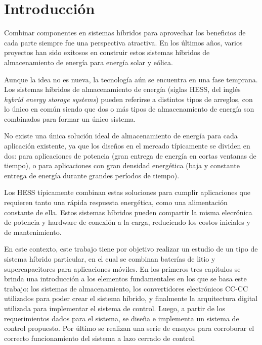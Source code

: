 \chapter*{Introducción}

Combinar componentes en sistemas híbridos para aprovechar los beneficios de cada parte siempre fue una perspectiva atractiva. En los últimos años, varios proyectos han sido exitosos en construir estos sistemas híbridos de almacenamiento de energía para energía solar y eólica.

Aunque la idea no es nueva, la tecnología aún se encuentra en una fase temprana. Los sistemas híbridos de almacenamiento de energía (siglas HESS, del inglés \emph{hybrid energy storage systems}) pueden referirse a distintos tipos de arreglos, con lo único en común siendo que dos o más tipos de almacenamiento de energía son combinados para formar un único sistema.

No existe una única solución ideal de almacenamiento de energía para cada aplicación existente, ya que los diseños en el mercado típicamente se dividen en dos: para aplicaciones de potencia (gran entrega de energía en cortas ventanas de tiempo), o para aplicaciones con gran densidad energética (baja y constante entrega de energía durante grandes períodos de tiempo).

Los HESS típicamente combinan estas soluciones para cumplir aplicaciones que requieren tanto una rápida respuesta energética, como una alimentación constante de ella. Estos sistemas híbridos pueden compartir la misma elecrónica de potencia y hardware de conexión a la carga, reduciendo los costos iniciales y de mantenimiento.

En este contexto, este trabajo tiene por objetivo realizar un estudio de un tipo de sistema híbrido particular, en el cual se combinan baterías de litio y supercapacitores para aplicaciones móviles. En los primeros tres capítulos se brinda una introducción a los elementos fundamentales en los que se basa este trabajo: los sistemas de almacenamiento, los convertidores electrónicos CC-CC utilizados para poder crear el sistema híbrido, y finalmente la arquitectura digital utilizada para implementar el sistema de control. Luego, a partir de los requerimientos dados para el sistema, se diseña e implementa un sistema de control propuesto. Por último se realizan una serie de ensayos para corroborar el correcto funcionamiento del sistema a lazo cerrado de control. 

\newpage